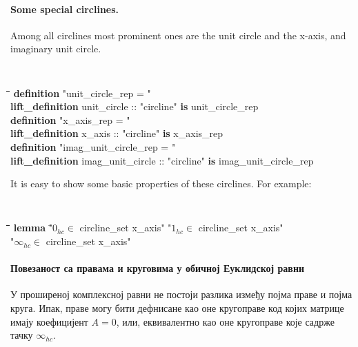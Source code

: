 \paragraph{Some special circlines.}
Among all circlines most prominent ones are the unit circle and the
x-axis, and imaginary unit circle.  {\tt
\begin{tabbing}
\hspace{5mm}\=\hspace{5mm}\=\hspace{5mm}\=\hspace{5mm}\=\hspace{5mm}\=\kill
{\bf definition} "unit\_circle\_rep = "\\
{\bf lift\_definition} unit\_circle :: "circline" {\bf is} unit\_circle\_rep\\
{\bf definition} "x\_axis\_rep = "\\
{\bf lift\_definition} x\_axis :: "circline" {\bf is} x\_axis\_rep\\
{\bf definition} "imag\_unit\_circle\_rep = "\\
{\bf lift\_definition} imag\_unit\_circle :: "circline" {\bf is} imag\_unit\_circle\_rep
\end{tabbing}
}

It is easy to show some basic properties of these circlines. For example:
{\tt
\begin{tabbing}
\hspace{5mm}\=\hspace{5mm}\=\hspace{5mm}\=\hspace{5mm}\=\hspace{5mm}\=\kill
{\bf lemma} \="$0_{hc} \in $ circline\_set x\_axis" "$1_{hc} \in $ circline\_set x\_axis" \\
\>"$\infty_{hc} \in $ circline\_set x\_axis"
\end{tabbing}
}

\paragraph{Повезаност са правама и круговима у обичној Еуклидској равни}
У проширеној комплексној равни не постоји разлика између појма праве и
појма круга. Ипак, праве могу бити дефнисане као оне кругоправе код
којих матрице имају коефицијент $A = 0$, или, еквивалентно као оне
кругоправе које садрже тачку $\infty_{hc}$.

